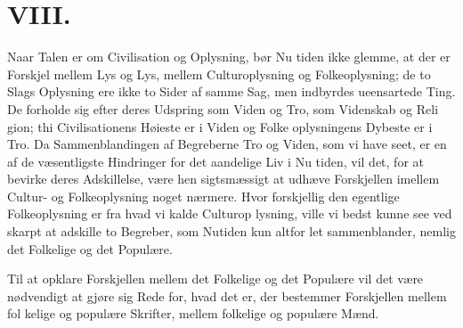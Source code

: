 \documentclass[12pt]{book}
\newcommand{\opage}[1]{\marginnote{\footnotesize\textit{[#1]}}}
\begin{document}
\chapter*{VIII.}
\label{ch:viii}
\opage{119}\setcounter{footnote}{0}%
Naar Talen er om Civilisation og Oplysning, bør Nu\-%
tiden ikke glemme, at der er Forskjel mellem Lys og
Lys, mellem Culturoplysning og Folkeoplysning; de to
Slags Oplysning ere ikke to Sider af samme Sag, men
indbyrdes ueensartede Ting. De forholde sig efter deres
Udspring som Viden og Tro, som Videnskab og Reli\-%
gion; thi Civilisationens Høieste er i Viden og Folke\-%
oplysningens Dybeste er i Tro. Da Sammenblandingen
af Begreberne Tro og Viden, som vi have seet, er en af
de væsentligste Hindringer for det aandelige Liv i Nu\-%
tiden, vil det, for at bevirke deres Adskillelse, være hen\-%
sigtsmæssigt at udhæve Forskjellen imellem Cultur- og
Folkeoplysning noget nærmere. Hvor forskjellig den
egentlige Folkeoplysning er fra hvad vi kalde Culturop\-%
lysning, ville vi bedst kunne see ved skarpt at adskille
to Begreber, som Nutiden kun altfor let sammenblander,
nemlig det Folkelige og det Populære.

Til at opklare Forskjellen mellem det Folkelige og
det Populære vil det være nødvendigt at gjøre sig Rede
for, hvad det er, der bestemmer Forskjellen mellem fol\-%
kelige og populære Skrifter, mellem folkelige og populære
Mænd.
\end{document}
